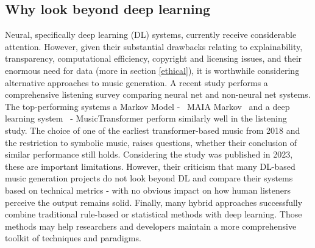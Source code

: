 \subsection{Why look beyond deep learning}
Neural, specifically deep learning (DL) systems, currently receive considerable attention. However, given their substantial drawbacks relating to explainability, transparency, computational efficiency, copyright and licensing issues, and their enormous need for data (more in section \ref{ethical}), it is worthwhile considering alternative approaches to music generation. A recent study \cite{Yin_Reuben_Stepney_Collins_2023} performs a comprehensive listening survey comparing neural net and non-neural net systems. The top-performing systems a Markov Model -  MAIA Markov \cite{Collins_Laney_2017}  and a deep learning system  - MusicTransformer \cite{Huang_Vaswani_Uszkoreit_Shazeer_Simon_Hawthorne_Dai_Hoffman_Dinculescu_Eck_2018} perform similarly well in the listening study. The choice of one of the earliest transformer-based music from 2018 \cite{Huang_Vaswani_Uszkoreit_Shazeer_Simon_Hawthorne_Dai_Hoffman_Dinculescu_Eck_2018} and the restriction to symbolic music, raises questions, whether their conclusion of similar performance still holds. Considering the study was published in 2023, these are important limitations. However, their criticism that many DL-based music generation projects do not look beyond DL and compare their systems based on technical metrics - with no obvious impact on how human listeners perceive the output remains solid. Finally, many hybrid approaches successfully combine traditional rule-based or statistical methods with deep learning. Those methods may help researchers and developers maintain a more comprehensive toolkit of techniques and paradigms. 

